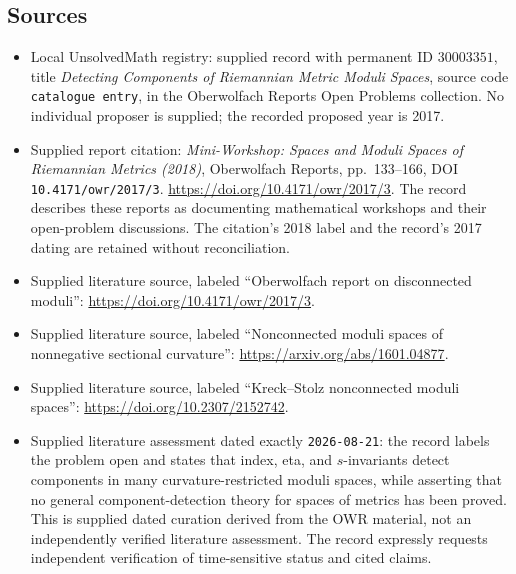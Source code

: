 \documentclass[11pt]{article}
\begin{document}
\subsection{Sources}
\begin{itemize}
\item Local UnsolvedMath registry: supplied record with permanent ID \(30003351\), title \emph{Detecting Components of Riemannian Metric Moduli Spaces}, source code \texttt{catalogue entry}, in the Oberwolfach Reports Open Problems collection. No individual proposer is supplied; the recorded proposed year is 2017.
\item Supplied report citation: \emph{Mini-Workshop: Spaces and Moduli Spaces of Riemannian Metrics (2018)}, Oberwolfach Reports, pp.\ 133--166, DOI \texttt{10.4171/owr/2017/3}. \url{https://doi.org/10.4171/owr/2017/3}. The record describes these reports as documenting mathematical workshops and their open-problem discussions. The citation's 2018 label and the record's 2017 dating are retained without reconciliation.
\item Supplied literature source, labeled ``Oberwolfach report on disconnected moduli'': \url{https://doi.org/10.4171/owr/2017/3}.
\item Supplied literature source, labeled ``Nonconnected moduli spaces of nonnegative sectional curvature'': \url{https://arxiv.org/abs/1601.04877}.
\item Supplied literature source, labeled ``Kreck--Stolz nonconnected moduli spaces'': \url{https://doi.org/10.2307/2152742}.
\item Supplied literature assessment dated exactly \texttt{2026-08-21}: the record labels the problem open and states that index, eta, and \(s\)-invariants detect components in many curvature-restricted moduli spaces, while asserting that no general component-detection theory for spaces of metrics has been proved. This is supplied dated curation derived from the OWR material, not an independently verified literature assessment. The record expressly requests independent verification of time-sensitive status and cited claims.
\end{itemize}
\end{document}
